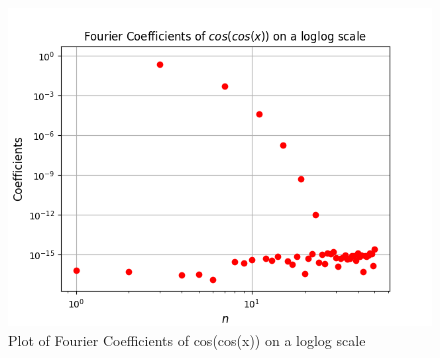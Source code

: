 \documentclass{article}
\begin{document}
\begin{figure}
    \centering
    \includegraphics[scale = 0.4]{Figure_6.png}
    \caption{Plot of Fourier Coefficients of cos(cos(x)) on a loglog scale}
    \label{fig:my_label}
\end{figure}


\newpage
\end{document}
